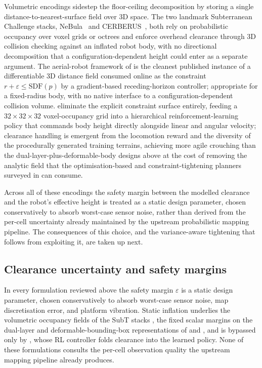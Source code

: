 \documentclass[11pt,a4paper]{article}
\begin{document}
Volumetric encodings sidestep the floor-ceiling decomposition by storing a single distance-to-nearest-surface field over 3D space. The two landmark Subterranean Challenge stacks, NeBula~\citep{aghaNeBulaQuestRobotic2021} and CERBERUS~\citep{tranzattoTeamCERBERUSWins2024}, both rely on probabilistic occupancy over voxel grids or octrees and enforce overhead clearance through 3D collision checking against an inflated robot body, with no directional decomposition that a configuration-dependent height could enter as a separate argument. The aerial-robot framework of \citet{jacquet2025sdfnmpc} is the cleanest published instance of a differentiable 3D distance field consumed online as the constraint $r + \varepsilon \leq \mathrm{SDF}(p)$ by a gradient-based receding-horizon controller; appropriate for a fixed-radius body, with no native interface to a configuration-dependent collision volume. \citet{mikiLearningWalkConfined2024} eliminate the explicit constraint surface entirely, feeding a $32 \times 32 \times 32$ voxel-occupancy grid into a hierarchical reinforcement-learning policy that commands body height directly alongside linear and angular velocity; clearance handling is emergent from the locomotion reward and the diversity of the procedurally generated training terrains, achieving more agile crouching than the dual-layer-plus-deformable-body designs above at the cost of removing the analytic field that the optimisation-based and constraint-tightening planners surveyed in  can consume.

Across all of these encodings the safety margin between the modelled clearance and the robot's effective height is treated as a static design parameter, chosen conservatively to absorb worst-case sensor noise, rather than derived from the per-cell uncertainty already maintained by the upstream probabilistic mapping pipeline. The consequences of this choice, and the variance-aware tightening that follows from exploiting it, are taken up next.

\subsection{Clearance uncertainty and safety margins}
\label{sec:sq3:uncertainty}

In every formulation reviewed above the safety margin $\varepsilon$ is a static design parameter, chosen conservatively to absorb worst-case sensor noise, map discretisation error, and platform vibration. Static inflation underlies the volumetric occupancy fields of the SubT stacks \citep{aghaNeBulaQuestRobotic2021,tranzattoTeamCERBERUSWins2024}, the fixed scalar margins on the dual-layer and deformable-bounding-box representations of \citet{buchananWalkingPostureAdaptation2019} and \citet{DeformableConfigurationPlanning}, and is bypassed only by \citet{mikiLearningWalkConfined2024}, whose RL controller folds clearance into the learned policy. None of these formulations consults the per-cell observation quality the upstream mapping pipeline already produces.
\end{document}
